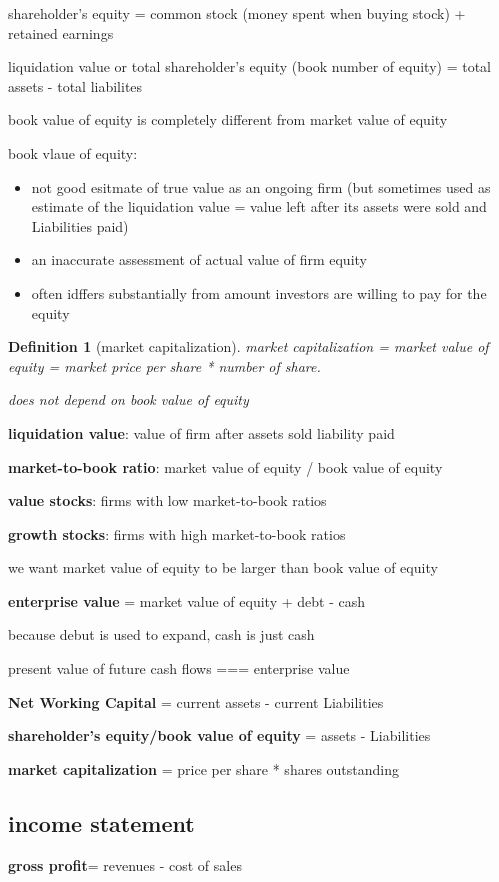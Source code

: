 \documentclass[10pt]{article}
\theoremstyle{break}
\newtheorem{defn}{Definition}[subsection]
\begin{document}
shareholder's equity = common stock (money spent when buying stock) + retained earnings 

liquidation value or total shareholder's equity (book number of equity) = total assets - total liabilites 

book value of equity is completely different from market value of equity

book vlaue of equity: 
\begin{itemize}
    \item not good esitmate of true value as an ongoing firm (but sometimes used as estimate of the liquidation value = value left after its assets were sold and Liabilities paid)
    \item an inaccurate assessment of actual value of firm equity 
    \item  often idffers substantially from amount investors are willing to pay for the equity
\end{itemize}

\begin{defn}[market capitalization]
    market capitalization = market value of equity = market price per share * number of share. 

    does not depend on book value of equity
\end{defn}

\textbf{liquidation value}: value of firm after assets sold liability paid 

\textbf{market-to-book ratio}: market value of equity / book value of equity

\textbf{value stocks}: firms with low market-to-book ratios

\textbf{growth stocks}: firms with high market-to-book ratios

we want market value of equity to be larger than book value of equity

\textbf{enterprise value} = market value of equity + debt - cash

because debut is used to expand, cash is just cash 

present value of future cash flows === enterprise value

\textbf{Net Working Capital} = current assets - current Liabilities

\textbf{shareholder's equity/book value of equity} = assets - Liabilities

\textbf{market capitalization} = price per share * shares outstanding

\subsection{income statement}
\textbf{gross profit}= revenues - cost of sales
\end{document}
